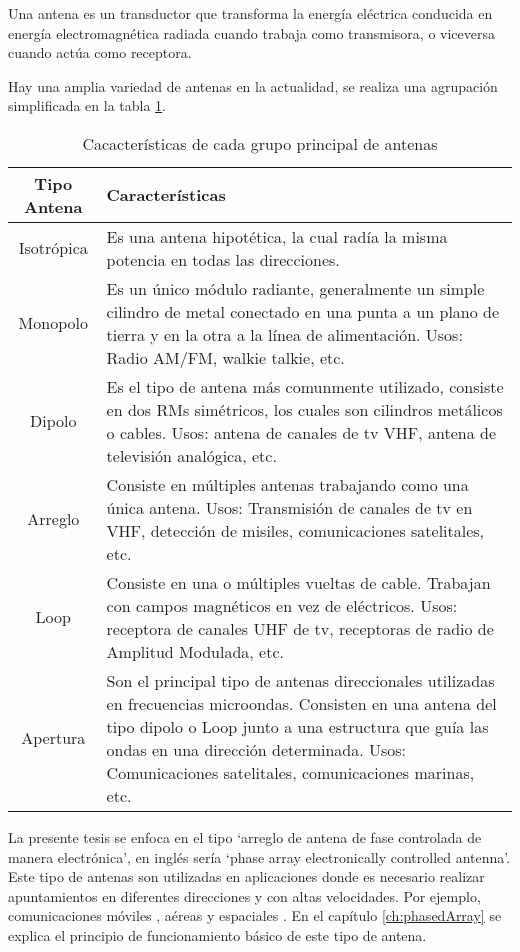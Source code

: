 Una antena es un transductor que transforma la energía eléctrica conducida en energía electromagnética radiada cuando 
trabaja como transmisora, o viceversa cuando actúa como receptora.

Hay una amplia variedad de antenas en la actualidad, se realiza una agrupación simplificada en la tabla \ref{tab:type_antennas}.

\begin{table}[H]
  \footnotesize
  \centering
  \begin{tabular}{|c|p{9cm}|}
	\hline
	\textbf{Tipo Antena} & \textbf{Características} \\\hline
	Isotrópica & Es una antena hipotética, la cual radía la misma potencia en todas las direcciones.\\\hline
	Monopolo & Es un único módulo radiante, generalmente un simple cilindro de metal conectado en una punta a un plano de 
	tierra y en la otra a la línea de alimentación. Usos: Radio AM/FM, walkie talkie, etc. \\\hline
	Dipolo & Es el tipo de antena más comunmente utilizado, consiste en dos RMs simétricos, los cuales son cilindros 
	metálicos o cables. Usos: antena de canales de tv VHF, antena de televisión analógica, etc. \\\hline
	Arreglo & Consiste en múltiples antenas trabajando como una única antena. Usos: Transmisión de canales de tv en VHF, 
	detección de misiles, comunicaciones satelitales, etc.\\\hline
	Loop & Consiste en una o múltiples vueltas de cable. Trabajan con campos magnéticos en vez de eléctricos. Usos: receptora 
	de canales UHF de tv, receptoras de radio de Amplitud Modulada, etc.\\\hline
	Apertura & Son el principal tipo de antenas direccionales utilizadas en frecuencias microondas. Consisten en una antena 
	del tipo dipolo o Loop junto a una estructura que guía las ondas en una dirección determinada. Usos: Comunicaciones 
	satelitales, comunicaciones marinas, etc.\\\hline
  \end{tabular}
  \caption{Cacacterísticas de cada grupo principal de antenas}
  \label{tab:type_antennas}
\end{table}

La presente tesis se enfoca en el tipo \enquote*{arreglo de antena de fase controlada de manera electrónica}, en inglés 
sería \enquote*{phase array electronically controlled antenna}. Este tipo de antenas son utilizadas en aplicaciones donde 
es necesario realizar apuntamientos en diferentes direcciones y con altas velocidades. Por ejemplo, comunicaciones móviles 
\cite{Chen2012}, aéreas \cite{MHong1989} y espaciales \cite{Shimada1995}\cite{Makhoul2012}. En el capítulo 
\ref{ch:phasedArray} se explica el principio de funcionamiento básico de este tipo de antena. 

